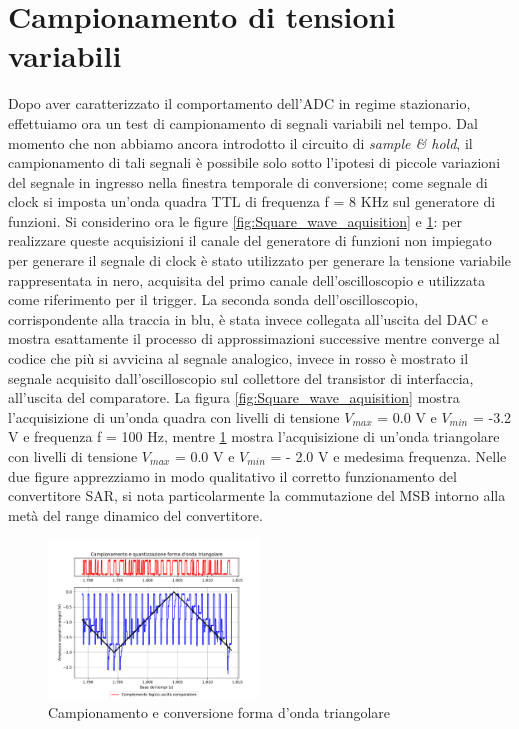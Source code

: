 \documentclass[journal]{IEEEtran}
\begin{document}
\section{Campionamento di tensioni variabili}
Dopo aver caratterizzato il comportamento dell'ADC in regime stazionario, effettuiamo ora un test di campionamento di segnali variabili nel tempo. Dal momento che non abbiamo ancora introdotto il circuito di \textit{sample \& hold}, il campionamento di tali segnali è possibile solo sotto l'ipotesi di piccole variazioni del segnale in ingresso nella finestra temporale di conversione; come segnale di clock si imposta un'onda quadra TTL di frequenza f = 8 KHz sul generatore di funzioni. Si considerino ora le figure \ref{fig:Square_wave_aquisition} e \ref{fig:Triangular_wave_aquisition}: per realizzare queste acquisizioni il canale del generatore di funzioni non impiegato per generare il segnale di clock è stato utilizzato per generare la tensione variabile rappresentata in nero, acquisita del primo canale dell'oscilloscopio e utilizzata come riferimento per il trigger. La seconda sonda dell'oscilloscopio, corrispondente alla traccia in blu, è stata invece collegata all'uscita del DAC e mostra esattamente il processo di approssimazioni successive mentre converge al codice che più si avvicina al segnale analogico, invece in rosso è mostrato il segnale acquisito dall'oscilloscopio sul collettore del transistor di interfaccia, all'uscita del comparatore. La figura \ref{fig:Square_wave_aquisition} mostra l'acquisizione di un'onda quadra con livelli di tensione $V_{max}$ = 0.0 V e $V_{min}$ = -3.2 V e frequenza f = 100 Hz, mentre \ref{fig:Triangular_wave_aquisition} mostra l'acquisizione di un'onda triangolare con livelli di tensione $V_{max}$ = 0.0 V e $V_{min}$ = - 2.0 V e medesima frequenza. Nelle due figure apprezziamo in modo qualitativo il corretto funzionamento del convertitore SAR, si nota particolarmente la commutazione del MSB intorno alla metà del range dinamico del convertitore.


\begin{figure}[H]%
\begin{center}
\includegraphics[trim = {0 25 0 0},clip, width=0.50\textwidth]{analysis/output/triangle_wave_aq.pdf}
\caption{Campionamento e conversione forma d'onda triangolare}
\label{fig:Triangular_wave_aquisition}
\end{center}
\end{figure}
\end{document}

